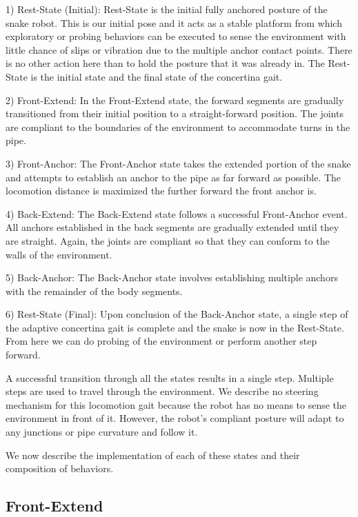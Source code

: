 1) Rest-State (Initial): Rest-State is the initial fully anchored posture of the snake robot. This is our initial pose and it acts as a stable platform from which exploratory or probing behaviors can be executed to sense the environment with little chance of slips or vibration due to the multiple anchor contact points. There is no other action here than to hold the posture that it was already in. The Rest-State is the initial state and the final state of the concertina gait.

2) Front-Extend: In the Front-Extend state, the forward segments are gradually transitioned from their initial position to a straight-forward position. The joints are compliant to the boundaries of the environment to accommodate turns in the pipe.

3) Front-Anchor: The Front-Anchor state takes the extended portion of the snake and attempts to establish an anchor to the pipe as far forward as possible. The locomotion distance is maximized the further forward the front anchor is.

4) Back-Extend: The Back-Extend state follows a successful Front-Anchor event. All anchors established in the back segments are gradually extended until they are straight. Again, the joints are compliant so that they can conform to the walls of the environment.

5) Back-Anchor: The Back-Anchor state involves establishing multiple anchors with the remainder of the body segments.

6) Rest-State (Final): Upon conclusion of the Back-Anchor state, a single step of the adaptive concertina gait is complete and the snake is now in the Rest-State. From here we can do probing of the environment or perform another step forward.

A successful transition through all the states results in a single step. Multiple steps are used to travel through the environment. We describe no steering mechanism for this locomotion gait because the robot has no means to sense the environment in front of it. However, the robot's compliant posture will adapt to any junctions or pipe curvature and follow it.

We now describe the implementation of each of these states and their composition of behaviors.

\subsection{Front-Extend}
\label{front-extend}


